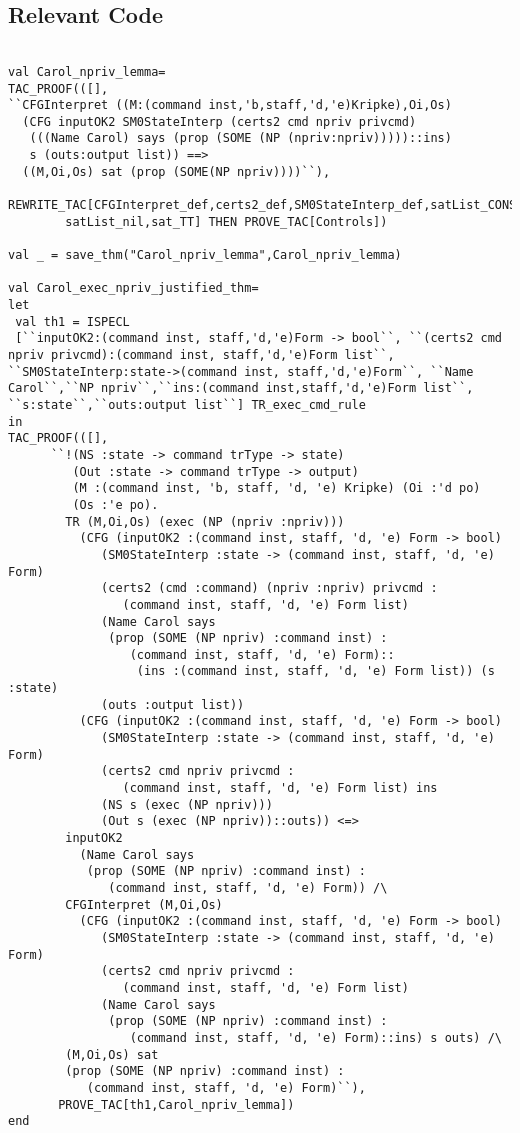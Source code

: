 \documentclass{report}
\begin{document}
\subsection{Relevant Code}
\label{rel-code-6}
\begin{lstlisting}[frame=TBlr]

val Carol_npriv_lemma= 
TAC_PROOF(([],
``CFGInterpret ((M:(command inst,'b,staff,'d,'e)Kripke),Oi,Os)
  (CFG inputOK2 SM0StateInterp (certs2 cmd npriv privcmd)
   (((Name Carol) says (prop (SOME (NP (npriv:npriv)))))::ins)
   s (outs:output list)) ==>
  ((M,Oi,Os) sat (prop (SOME(NP npriv))))``),
  REWRITE_TAC[CFGInterpret_def,certs2_def,SM0StateInterp_def,satList_CONS,
	    satList_nil,sat_TT] THEN PROVE_TAC[Controls])

val _ = save_thm("Carol_npriv_lemma",Carol_npriv_lemma)

val Carol_exec_npriv_justified_thm=
let
 val th1 = ISPECL
 [``inputOK2:(command inst, staff,'d,'e)Form -> bool``, ``(certs2 cmd npriv privcmd):(command inst, staff,'d,'e)Form list``, ``SM0StateInterp:state->(command inst, staff,'d,'e)Form``, ``Name Carol``,``NP npriv``,``ins:(command inst,staff,'d,'e)Form list``, ``s:state``,``outs:output list``] TR_exec_cmd_rule
in
TAC_PROOF(([],
      ``!(NS :state -> command trType -> state)
         (Out :state -> command trType -> output)
         (M :(command inst, 'b, staff, 'd, 'e) Kripke) (Oi :'d po)
         (Os :'e po).
        TR (M,Oi,Os) (exec (NP (npriv :npriv)))
          (CFG (inputOK2 :(command inst, staff, 'd, 'e) Form -> bool)
             (SM0StateInterp :state -> (command inst, staff, 'd, 'e) Form)
             (certs2 (cmd :command) (npriv :npriv) privcmd :
                (command inst, staff, 'd, 'e) Form list)
             (Name Carol says
              (prop (SOME (NP npriv) :command inst) :
                 (command inst, staff, 'd, 'e) Form)::
                  (ins :(command inst, staff, 'd, 'e) Form list)) (s :state)
             (outs :output list))
          (CFG (inputOK2 :(command inst, staff, 'd, 'e) Form -> bool)
             (SM0StateInterp :state -> (command inst, staff, 'd, 'e) Form)
             (certs2 cmd npriv privcmd :
                (command inst, staff, 'd, 'e) Form list) ins
             (NS s (exec (NP npriv)))
             (Out s (exec (NP npriv))::outs)) <=>
        inputOK2
          (Name Carol says
           (prop (SOME (NP npriv) :command inst) :
              (command inst, staff, 'd, 'e) Form)) /\
        CFGInterpret (M,Oi,Os)
          (CFG (inputOK2 :(command inst, staff, 'd, 'e) Form -> bool)
             (SM0StateInterp :state -> (command inst, staff, 'd, 'e) Form)
             (certs2 cmd npriv privcmd :
                (command inst, staff, 'd, 'e) Form list)
             (Name Carol says
              (prop (SOME (NP npriv) :command inst) :
                 (command inst, staff, 'd, 'e) Form)::ins) s outs) /\
        (M,Oi,Os) sat
        (prop (SOME (NP npriv) :command inst) :
           (command inst, staff, 'd, 'e) Form)``),
	   PROVE_TAC[th1,Carol_npriv_lemma])
end


\end{lstlisting}
\end{document}
